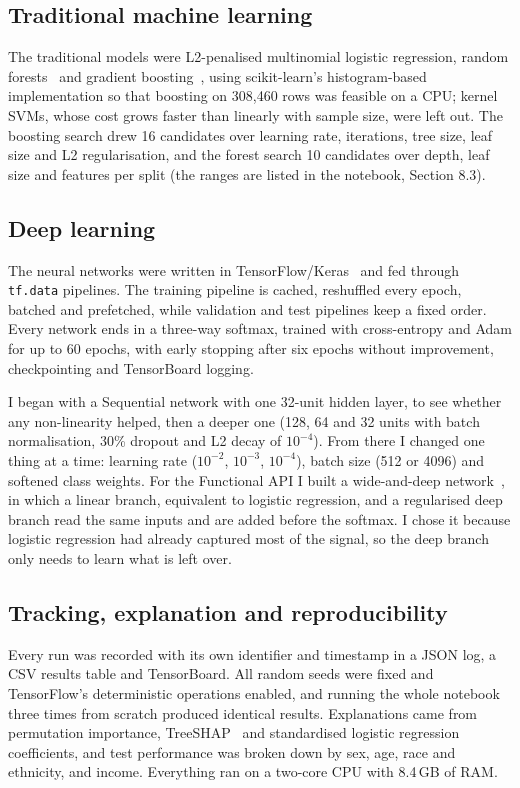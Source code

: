 \subsection{Traditional machine learning}
The traditional models were L2-penalised multinomial logistic regression, random forests~\cite{breiman2001} and gradient boosting~\cite{friedman2001}, using scikit-learn's histogram-based implementation so that boosting on 308,460 rows was feasible on a CPU; kernel SVMs, whose cost grows faster than linearly with sample size, were left out. The boosting search drew 16 candidates over learning rate, iterations, tree size, leaf size and L2 regularisation, and the forest search 10 candidates over depth, leaf size and features per split (the ranges are listed in the notebook, Section 8.3).

\subsection{Deep learning}
The neural networks were written in TensorFlow/Keras~\cite{abadi2016} and fed through \texttt{tf.data} pipelines. The training pipeline is cached, reshuffled every epoch, batched and prefetched, while validation and test pipelines keep a fixed order. Every network ends in a three-way softmax, trained with cross-entropy and Adam for up to 60 epochs, with early stopping after six epochs without improvement, checkpointing and TensorBoard logging.

I began with a Sequential network with one 32-unit hidden layer, to see whether any non-linearity helped, then a deeper one (128, 64 and 32 units with batch normalisation, 30\% dropout and L2 decay of $10^{-4}$). From there I changed one thing at a time: learning rate ($10^{-2}$, $10^{-3}$, $10^{-4}$), batch size (512 or 4096) and softened class weights. For the Functional API I built a wide-and-deep network~\cite{cheng2016}, in which a linear branch, equivalent to logistic regression, and a regularised deep branch read the same inputs and are added before the softmax. I chose it because logistic regression had already captured most of the signal, so the deep branch only needs to learn what is left over.

\subsection{Tracking, explanation and reproducibility}
Every run was recorded with its own identifier and timestamp in a JSON log, a CSV results table and TensorBoard. All random seeds were fixed and TensorFlow's deterministic operations enabled, and running the whole notebook three times from scratch produced identical results. Explanations came from permutation importance, TreeSHAP~\cite{lundberg2017} and standardised logistic regression coefficients, and test performance was broken down by sex, age, race and ethnicity, and income. Everything ran on a two-core CPU with 8.4\,GB of RAM.
